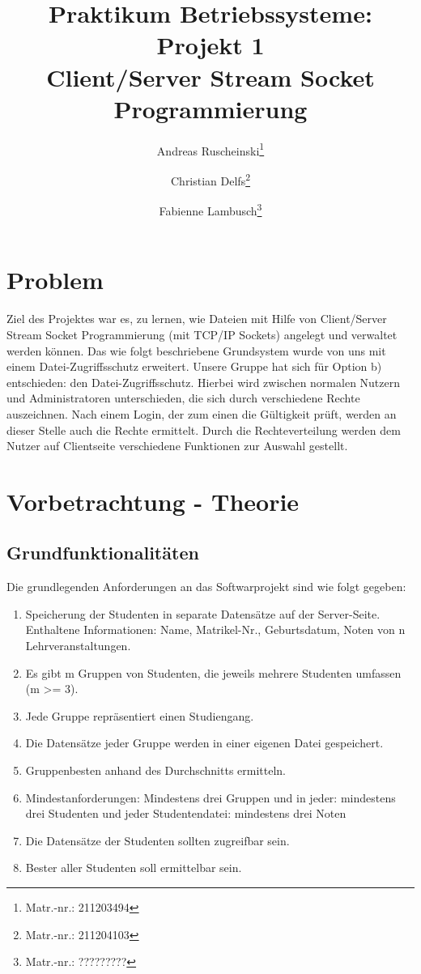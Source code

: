 \documentclass{scrartcl}
\title{Praktikum Betriebssysteme: Projekt 1\\ Client/Server Stream Socket Programmierung}
\author{Andreas Ruscheinski\thanks{Matr.-nr.: 211203494}\and Christian Delfs\thanks{Matr.-nr.: 211204103}\and Fabienne Lambusch\thanks{Matr.-nr.: ?????????}}
\begin{document}
\maketitle
\tableofcontents
\newpage
\section{Problem}
	Ziel des Projektes war es, zu lernen, wie Dateien mit Hilfe von Client/Server Stream Socket Programmierung (mit TCP/IP Sockets) angelegt und verwaltet werden können. Das wie folgt beschriebene Grundsystem wurde von uns mit einem Datei-Zugriffsschutz erweitert. 
	Unsere Gruppe hat sich für Option b) entschieden: den Datei-Zugriffsschutz. Hierbei wird zwischen normalen Nutzern und Administratoren unterschieden, die sich durch verschiedene Rechte auszeichnen. Nach einem Login, der zum einen die Gültigkeit prüft, werden an dieser Stelle auch die Rechte ermittelt. Durch die Rechteverteilung werden dem Nutzer auf Clientseite verschiedene Funktionen zur Auswahl gestellt.\\

\section{Vorbetrachtung - Theorie}
	\subsection{Grundfunktionalitäten}
		Die grundlegenden Anforderungen an das Softwarprojekt sind wie folgt gegeben:
		\begin{enumerate}
		\item Speicherung der Studenten in separate Datensätze auf der Server-Seite. Enthaltene Informationen: Name, Matrikel-Nr., Geburtsdatum, Noten von n
		Lehrveranstaltungen.
		\item Es gibt m Gruppen von Studenten, die jeweils mehrere Studenten umfassen (m >= 3).
		\item Jede Gruppe repräsentiert einen Studiengang.
		\item Die Datensätze jeder Gruppe werden in einer eigenen Datei gespeichert.
		\item Gruppenbesten anhand des Durchschnitts ermitteln.
		\item Mindestanforderungen: Mindestens drei Gruppen und in jeder: mindestens drei Studenten und jeder Studentendatei: mindestens drei Noten
		\item Die Datensätze der Studenten sollten zugreifbar sein.
		\item Bester aller Studenten soll ermittelbar sein.
		
		\end{enumerate}
\end{document}
